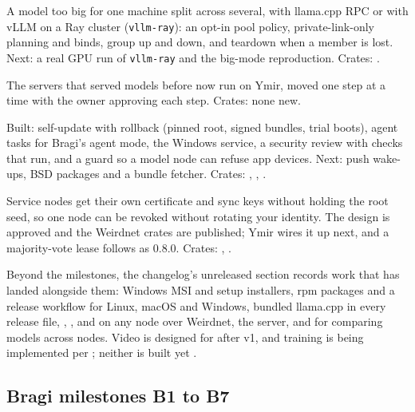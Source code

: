 \begin{rowlist}
  \item[M7 Split models \status{In progress}] A model too big for one machine split across several, with llama.cpp RPC or with vLLM on a Ray cluster (\texttt{vllm-ray}): an opt-in pool policy, private-link-only planning and binds, group up and down, and teardown when a member is lost. Next: a real GPU run of \texttt{vllm-ray} and the big-mode reproduction. Crates: .
  \item[M8 Move existing servers onto Ymir \status{Done}] The servers that served models before now run on Ymir, moved one step at a time with the owner approving each step. Crates: none new.
  \item[M9 Breadth and hardening \status{In progress}] Built: self-update with rollback (pinned root, signed bundles, trial boots), agent tasks for Bragi's agent mode, the Windows service, a security review with checks that run, and a guard so a model node can refuse app devices. Next: push wake-ups, BSD packages and a bundle fetcher. Crates: , , .
  \item[M10 Cert-only server link \status{Planned}] Service nodes get their own certificate and sync keys without holding the root seed, so one node can be revoked without rotating your identity. The design is approved and the Weirdnet crates are published; Ymir wires it up next, and a majority-vote lease follows as  0.8.0. Crates: , .
\end{rowlist}

Beyond the milestones, the changelog's unreleased section records work that has landed alongside
them: Windows MSI and setup installers, rpm packages and a release workflow for Linux, macOS and
Windows, bundled llama.cpp in every release file, , ,
 and  on any node over Weirdnet, the  server, and  for comparing models across nodes. Video is
designed for after v1, and training is being implemented per ; neither
is built yet \planned.

\subsection{Bragi milestones B1 to B7}\label{sec:roadmap-bragi}


